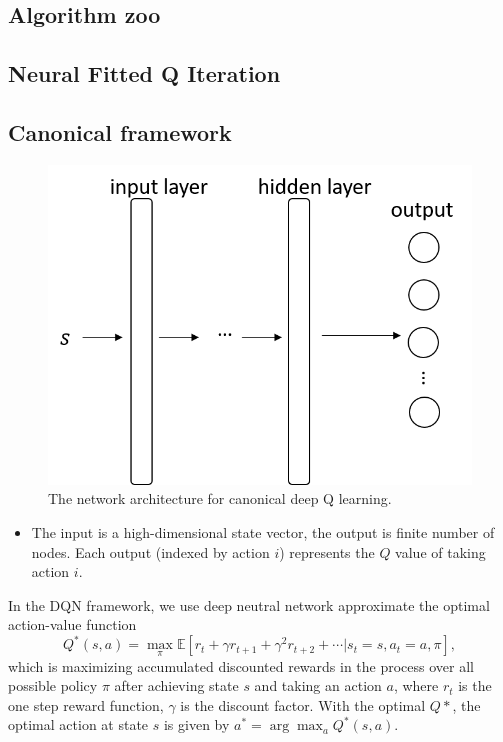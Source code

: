 \begin{refsection}
\section{Algorithm zoo}



\subsection{Neural Fitted Q Iteration}




\subsection{Canonical framework}

\begin{figure}
	\centering
	\includegraphics[width=0.5\linewidth]{../figures/optimalControl/reinforcementLearning/CanonicalDQN}
	\caption{The network architecture for canonical deep Q learning.}
	\label{fig:canonicaldqn}
\end{figure}

\begin{remark}\hfill
\begin{itemize}
	\item The input is a high-dimensional state vector, the output is finite number of nodes. Each output (indexed by action $i$) represents the $Q$ value of taking action $i$. 
\end{itemize}	
	
\end{remark}


In the DQN framework, we use deep neutral network approximate the optimal action-value function
$$Q^{*}(s, a)=\max _{\pi} \mathbb{E}\left[r_{t}+\gamma r_{t+1}+\gamma^{2} r_{t+2}+\cdots | s_{t}=s, a_{t}=a, \pi\right],$$
which is maximizing accumulated discounted rewards in the process over all possible policy $\pi$ after achieving state $s$ and taking an action $a$, where $r_t$ is the one step reward function, $\gamma$ is the discount factor. 
With the optimal $Q*$, the optimal action at state $s$ is given by $a^* = \arg\max_{a} Q^*(s, a)$.  


\end{refsection}
